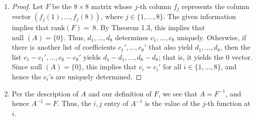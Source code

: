 \documentclass[12pt]{article}
\newenvironment{sol}[1][Solution]{\begin{trivlist}
		\item[\hskip \labelsep {\bfseries #1:}]}{\end{trivlist}}
\begin{document}
\begin{sol}
	\
	\begin{enumerate}[label=(\alph*)]
		\item \begin{proof}
			Let $F$ be the $8\times 8$ matrix whose $j$-th column $f_j$ represents the
			column vector $(f_j(1),\ldots,f_j(8))$, where $j\in\{1,\ldots,8\}$. The
			given information implies that $\text{rank}(F)=~8$. By Theorem 1.3, this
			implies that $\text{null }(A)=\{0\}$. Thus, $d_1,\ldots,d_8$ determines
			$c_1,\ldots,c_8$ uniquely. Otherwise, if there is another list of
			coefficients $c_1',\ldots,c_8'$ that also yield $d_1,\ldots,d_8$, then
			the list $c_1-c_1',\ldots,c_8-c_8'$ yields $d_1-d_1,\ldots,d_8-d_8$;
			that is, it yields the 0 vector. Since $\text{null }(A)=\{0\}$, this
			implies that $c_i=c_i'$ for all $i\in\{1,\ldots,8\}$, and hence the
			$c_i$'s are uniquely determined.
		\end{proof}
		\item Per the description of $A$ and our definition of $F$, we see that $A=F^{-1}$,
		and hence $A^{-1}=F$. Thus, the $i,j$ entry of $A^{-1}$ is the value of the
		$j$-th function at $i$.
	\end{enumerate}
\end{sol}
\end{document}
